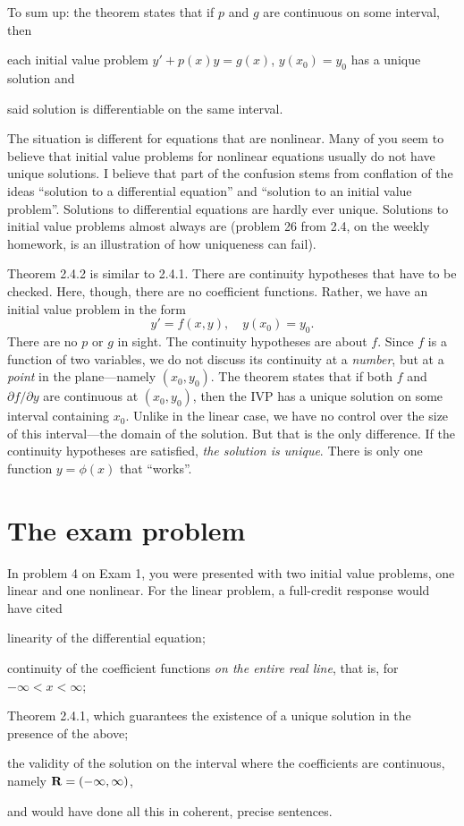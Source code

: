 \documentclass[twocolumn,12pt]{article}
\begin{document}
To sum up: the theorem states that if $p$ and $g$ are continuous on some interval, then
\begin{inparaenum}[(a)]
  \item each initial value problem $y' + p(x)y = g(x)$, $y(x_0) = y_0$ has a unique solution and
  \item said solution is differentiable on the same interval.
\end{inparaenum}

The situation is different for equations that are nonlinear. Many of you seem to believe that initial value problems for nonlinear equations usually do not have unique solutions. I believe that part of the confusion stems from conflation of the ideas ``solution to a differential equation'' and ``solution to an initial value problem''. Solutions to differential equations are hardly ever unique. Solutions to initial value problems almost always are (problem 26 from 2.4, on the weekly homework, is an illustration of how uniqueness can fail).

Theorem 2.4.2 is similar to 2.4.1. There are continuity hypotheses that have to be checked. Here, though, there are no coefficient functions. Rather, we have an initial value problem in the form
\[
    y' = f(x, y), \quad y(x_0) = y_0.
\]
There are no $p$ or $g$ in sight. The continuity hypotheses are about $f$. Since $f$ is a function of two variables, we do not discuss its continuity at a \emph{number}, but at a \emph{point} in the plane---namely $(x_0, y_0)$. The theorem states that if both $f$ and $\partial f/\partial y$ are continuous at $(x_0, y_0)$, then the IVP has a unique solution on some interval containing $x_0$. Unlike in the linear case, we have no control over the size of this interval---the domain of the solution. But that is the only difference. If the continuity hypotheses are satisfied, \emph{the solution is unique}. There is only one function $y = \phi(x)$ that ``works''.

\section{The exam problem}
In problem 4 on Exam 1, you were presented with two initial value problems, one linear and one nonlinear. For the linear problem, a full-credit response would have cited
\begin{inparaenum}[(a)]
    \item linearity of the differential equation;
    \item continuity of the coefficient functions \emph{on the entire real line}, that is, for $-\infty < x < \infty$;
    \item Theorem 2.4.1, which guarantees the existence of a unique solution in the presence of the above;
    \item the validity of the solution on the interval where the coefficients are continuous, namely $\mathbf{R} = (-\infty, \infty)$,
\end{inparaenum}
and would have done all this in coherent, precise sentences. 
\end{document}
